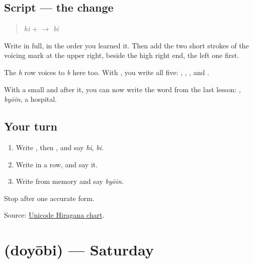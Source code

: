 \subsection*{Script — the change}

\begin{quote}
\textbf{} \emph{hi} + \textbf{} $\to$ \textbf{} \emph{bi}
\end{quote}

Write \textbf{} in full, in the order you learned it. Then add the two short strokes of the voicing mark at the upper right, beside the high right end, the left one first.

The \emph{h} row voices to \emph{b} here too. With \textbf{}, you write all five: \textbf{}, \textbf{}, \textbf{}, \textbf{} and \textbf{}.

With a small \textbf{} and \textbf{} after it, you can now write the word from the last lesson: \textbf{}, \emph{byōin}, a hospital.

\subsection*{Your turn}
\begin{enumerate}
\raggedright
  \item Write \textbf{}, then \textbf{}, and say \emph{hi}, \emph{bi}.
  \item Write \textbf{    } in a row, and say it.
  \item Write \textbf{} from memory and say \emph{byōin}.
\end{enumerate}

\begin{tcolorbox}[breakable,colback=teal!4,colframe=teal!35!black,title={Before you move on}]
Stop after one accurate form.

Source: \href{https://www.unicode.org/charts/PDF/U3040.pdf}{Unicode Hiragana chart}.
\end{tcolorbox}
\section[\texorpdfstring{\ja{どようび} (doyōbi)}{どようび (doyōbi)}]{ (doyōbi) — Saturday}

\label{lesson:JA-C135-doyoubi}



